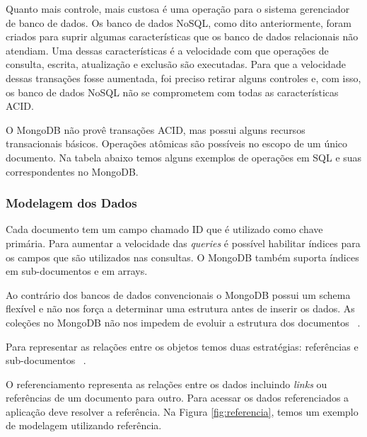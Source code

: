 Quanto mais controle, mais custosa é uma operação para o sistema gerenciador de banco de dados.  Os banco de dados NoSQL, como dito anteriormente, foram criados para suprir algumas características que os banco de dados relacionais não atendiam. Uma dessas características é a velocidade com que operações de consulta, escrita, atualização e exclusão são executadas.  Para que a velocidade dessas transações fosse aumentada, foi preciso retirar alguns controles e, com isso, os banco de dados NoSQL não se comprometem com todas as características ACID.

O MongoDB não provê transações ACID, mas possui alguns recursos transacionais básicos. Operações atômicas são possíveis no escopo de um único documento. Na tabela abaixo temos alguns exemplos de operações em SQL e suas correspondentes no MongoDB.

\subsubsection{Modelagem dos Dados}

Cada documento tem um campo chamado ID que é utilizado como chave primária. Para aumentar a velocidade das \textit{queries} é possível habilitar índices para os campos que são utilizados nas consultas. O MongoDB também suporta índices em sub-documentos e em arrays.

Ao contrário dos bancos de dados convencionais o MongoDB possui um schema flexível e não nos força a determinar uma estrutura antes de inserir os dados. As coleções no MongoDB não nos impedem de evoluir a estrutura dos documentos ~\cite{Orendanalysisand}.

Para representar as relações entre os objetos temos duas estratégias: referências e sub-documentos ~\cite{Orendanalysisand}.


O referenciamento representa as relações entre os dados incluindo \textit{links} ou referências de um documento para outro. Para acessar os dados referenciados a aplicação deve resolver a referência. Na Figura \ref{fig:referencia}, temos um exemplo de modelagem utilizando referência.


